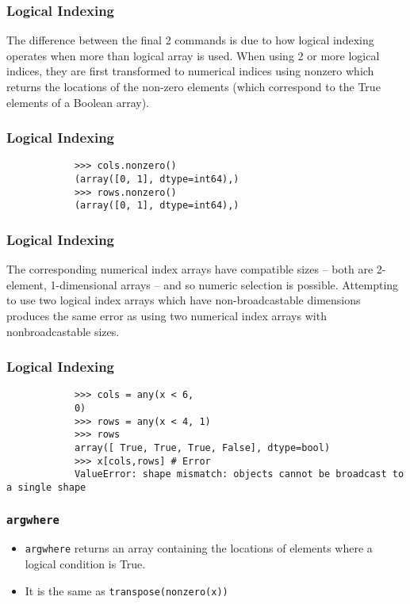 \documentclass[KSmainSlides.tex]{subfiles}
\begin{document}
	\begin{frame}[fragile]	
		\frametitle{Logical Indexing}
		The difference between the final 2 commands is due to how logical indexing operates when more than
		logical array is used. When using 2 or more logical indices, they are first transformed to numerical indices
		using nonzero which returns the locations of the non-zero elements (which correspond to the True
		elements of a Boolean array).
	\end{frame}
	\begin{frame}[fragile]	
		\frametitle*{Logical Indexing}
			\begin{framed}
			\begin{verbatim}
			>>> cols.nonzero()
			(array([0, 1], dtype=int64),)
			>>> rows.nonzero()
			(array([0, 1], dtype=int64),)
			\end{verbatim}
		\end{framed}
	\end{frame}

	\begin{frame}[fragile]	
		\frametitle{Logical Indexing}
		The corresponding numerical index arrays have compatible sizes – both are 2-element, 1-dimensional
		arrays – and so numeric selection is possible. Attempting to use two logical index arrays which have
		non-broadcastable dimensions produces the same error as using two numerical index arrays with nonbroadcastable
		sizes.
	\end{frame}
	\begin{frame}[fragile]	
		\frametitle{Logical Indexing}
			\begin{framed}
			\begin{verbatim}
			>>> cols = any(x < 6,
			0)
			>>> rows = any(x < 4, 1)
			>>> rows
			array([ True, True, True, False], dtype=bool)
			>>> x[cols,rows] # Error
			ValueError: shape mismatch: objects cannot be broadcast to a single shape
			\end{verbatim}
		\end{framed}
		\end{frame}
		\begin{frame}[fragile]	
		\frametitle{\texttt{argwhere}}
		\begin{itemize}
		\item 	\texttt{argwhere} returns an array containing the locations of elements where a logical condition is True.
		\item It is the
			same as \texttt{transpose(nonzero(x))}
		\end{itemize}
	
				\end{frame}
		
\end{document}
